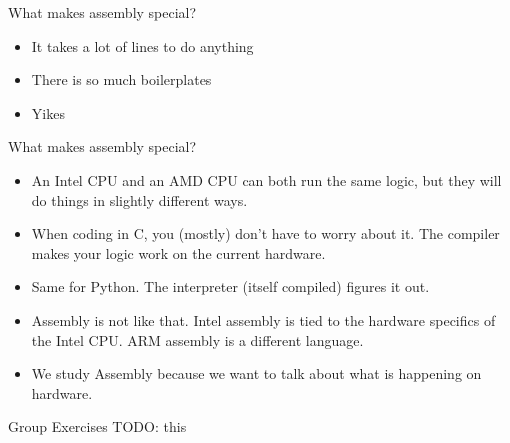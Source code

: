 \begin{frame}{What makes assembly special?}
	\begin{itemize}
		\item It takes a lot of lines to do anything
		\item There is so much boilerplates
		\item Yikes
	\end{itemize}
\end{frame}

\begin{frame}{What makes assembly special?}
	\begin{itemize}
		\item An Intel CPU and an AMD CPU can both run the same logic, but they will do things in slightly different ways.
		\item When coding in C, you (mostly) don't have to worry about it. The compiler makes your logic work on the current hardware.
		\item Same for Python. The interpreter (itself compiled) figures it out.
		\item Assembly is not like that. Intel assembly is tied to the hardware specifics of the Intel CPU. ARM assembly is a different language.
		\item We study Assembly because we want to talk about what is happening on hardware.
	\end{itemize}


\end{frame}


\begin{frame}{Group Exercises}
TODO: this
\end{frame}

